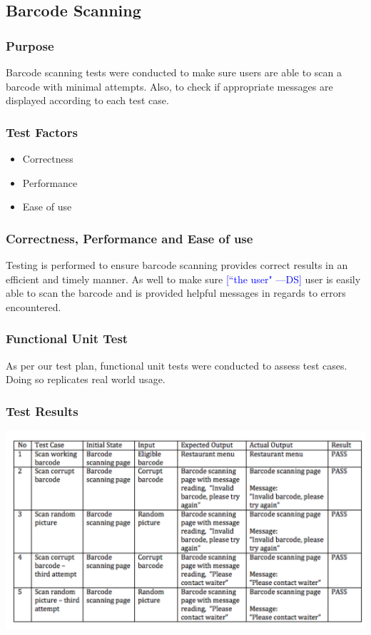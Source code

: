 \documentclass[12pt, titlepage]{article}
\newcommand{\authornote}[3]{\textcolor{#1}{[#3 ---#2]}}
\newcommand{\authornote}[3]{}
\newcommand{\ds}[1]{\authornote{blue}{DS}{#1}}
\begin{document}
\subsection{Barcode Scanning}

\subsubsection{Purpose}
Barcode scanning tests were conducted to make sure users are able to scan a barcode with minimal attempts. Also, to check if appropriate messages are displayed according to each test case.

\subsubsection{Test Factors}
\begin{itemize}
 \item Correctness
 \item Performance
 \item Ease of use
 \end{itemize}

\subsubsection{Correctness, Performance and Ease of use}
Testing is performed to ensure barcode scanning provides correct results in an efficient and timely manner. As well to make sure 
\ds{``the user"}
user is easily able to scan the barcode and is provided helpful messages in regards to errors encountered.

\subsubsection{Functional Unit Test}
As per our test plan, functional unit tests were  conducted to assess test cases. Doing so replicates real world usage.

\subsubsection{Test Results}
\includegraphics[width=1.2\textwidth]{barcodeTable.png}
\end{document}
